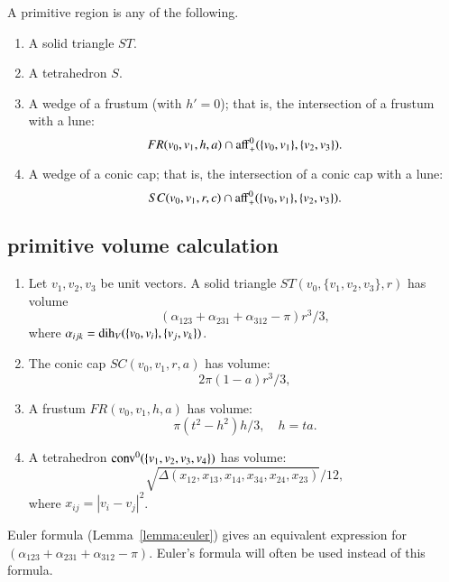 \begin{definition} A primitive region is any of the following.

\begin{enumerate}%
\label{enum:volume-prim}
 \item A solid triangle $ST$.
 \item A tetrahedron $S$.
 \item A wedge of a frustum (with $h'=0$); 
that is, the intersection of a frustum with
 a lune:
    $$
     FR(v_0,v_1,h,a) \cap {\operatorname{aff}}^0_+(\{v_0,v_1\},\{v_2,v_3\}).
    $$
\item A wedge of a conic cap; that is, the intersection of a conic cap
with
    a lune:
    $$
    SC(v_0,v_1,r,c) \cap{\operatorname{aff}}^0_+(\{v_0,v_1\},\{v_2,v_3\}).
    $$
\end{enumerate}

\end{definition}

\subsection{primitive volume calculation}

\begin{lemma}\label{lemma:prim-volume} 
\begin{enumerate} 
 \item Let $v_1,v_2,v_3$ be unit vectors.
   A solid triangle $ST(v_0,\{v_1,v_2,v_3\},r)$ has volume
   $$
   (\alpha_{123}+\alpha_{231}+\alpha_{312}-\pi)r^3/3,
   $$
   where $\alpha_{ijk} = \operatorname{dih}_V(\{v_0,v_i\},\{v_j,v_k\})$.
  \item The conic cap $SC(v_0,v_1,r,a)$ has volume:
   $$
    2\pi(1-a) r^3/3,
   $$
 \item A frustum $FR(v_0,v_1,h,a)$ has volume:
   $$
   \pi (t^2-h^2) h/3,\quad h = t a.
   $$
 \item A tetrahedron ${\operatorname{conv}}^0(\{v_1,v_2,v_3,v_4\})$ has volume:
   $$
   \sqrt{\Delta(x_{12},x_{13},x_{14},x_{34},x_{24},x_{23})}/12,
   $$
   where $x_{ij} = |v_i-v_j|^2$.
\end{enumerate}
\end{lemma}

Euler formula (Lemma~\ref{lemma:euler}) gives an
equivalent expression for $(\alpha_{123}+\alpha_{231}+\alpha_{312}-\pi)$.
Euler's formula will often be used instead of this formula.


